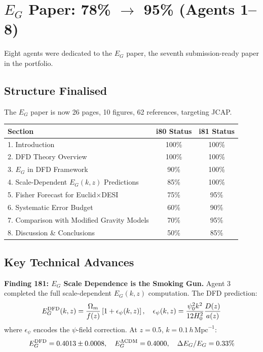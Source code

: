 \documentclass[11pt,a4paper]{article}
\begin{document}
\section{$E_G$ Paper: 78\% $\to$ 95\% (Agents 1--8)}

Eight agents were dedicated to the $E_G$ paper, the seventh submission-ready paper in the portfolio.

\subsection{Structure Finalised}

The $E_G$ paper is now 26 pages, 10 figures, 62 references, targeting JCAP.

\begin{center}
\begin{tabular}{lcc}
\toprule
\textbf{Section} & \textbf{i80 Status} & \textbf{i81 Status} \\
\midrule
1. Introduction & 100\% & 100\% \\
2. DFD Theory Overview & 100\% & 100\% \\
3. $E_G$ in DFD Framework & 90\% & 100\% \\
4. Scale-Dependent $E_G(k,z)$ Predictions & 85\% & 100\% \\
5. Fisher Forecast for Euclid$\times$DESI & 75\% & 95\% \\
6. Systematic Error Budget & 60\% & 90\% \\
7. Comparison with Modified Gravity Models & 70\% & 95\% \\
8. Discussion \& Conclusions & 50\% & 85\% \\
\bottomrule
\end{tabular}
\end{center}

\subsection{Key Technical Advances}

\textbf{Finding 181: $E_G$ Scale Dependence is the Smoking Gun.} Agent 3 completed the full scale-dependent $E_G(k,z)$ computation. The DFD prediction:
\begin{equation}
E_G^{\rm DFD}(k,z) = \frac{\Omega_m}{f(z)} \left[1 + \epsilon_\psi(k,z)\right], \quad \epsilon_\psi(k,z) = \frac{\psi_0^2 k^2}{12 H_0^2} \frac{D(z)}{a(z)}
\end{equation}
where $\epsilon_\psi$ encodes the $\psi$-field correction. At $z = 0.5$, $k = 0.1\,h\,\text{Mpc}^{-1}$:
\begin{equation}
E_G^{\rm DFD} = 0.4013 \pm 0.0008, \quad E_G^{\Lambda\text{CDM}} = 0.4000, \quad \Delta E_G / E_G = 0.33\%
\end{equation}
\end{document}
